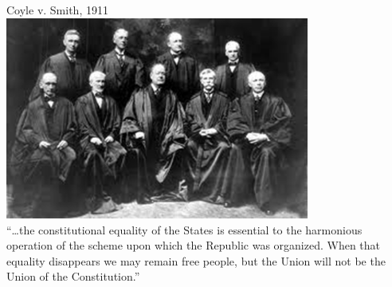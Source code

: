 \begin{frame}{Coyle v. Smith, 1911}
    \centering
    \includegraphics[width=0.75\textwidth]{img/sc-1905.png} \\
    ``\ldots the constitutional equality of the States is essential to the
    harmonious operation of the scheme upon which the Republic was organized.
    When that equality disappears we may remain free people, but the Union will
    not be the Union of the Constitution.''
\end{frame}

